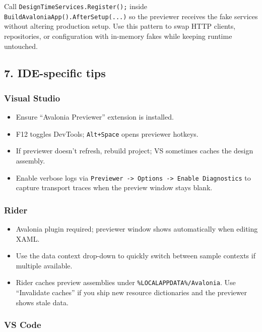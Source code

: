 Call \passthrough{\lstinline!DesignTimeServices.Register();!} inside
\passthrough{\lstinline!BuildAvaloniaApp().AfterSetup(...)!} so the
previewer receives the fake services without altering production setup.
Use this pattern to swap HTTP clients, repositories, or configuration
with in-memory fakes while keeping runtime untouched.

\subsection{7. IDE-specific tips}\label{ide-specific-tips}

\subsubsection{Visual Studio}\label{visual-studio-1}

\begin{itemize}
\tightlist
\item
  Ensure ``Avalonia Previewer'' extension is installed.
\item
  F12 toggles DevTools; \passthrough{\lstinline!Alt+Space!} opens
  previewer hotkeys.
\item
  If previewer doesn't refresh, rebuild project; VS sometimes caches the
  design assembly.
\item
  Enable verbose logs via
  \passthrough{\lstinline!Previewer -> Options -> Enable Diagnostics!}
  to capture transport traces when the preview window stays blank.
\end{itemize}

\subsubsection{Rider}\label{rider-1}

\begin{itemize}
\tightlist
\item
  Avalonia plugin required; previewer window shows automatically when
  editing XAML.
\item
  Use the data context drop-down to quickly switch between sample
  contexts if multiple available.
\item
  Rider caches preview assemblies under
  \passthrough{\lstinline!\%LOCALAPPDATA\%/Avalonia!}. Use ``Invalidate
  caches'' if you ship new resource dictionaries and the previewer shows
  stale data.
\end{itemize}

\subsubsection{VS Code}\label{vs-code-1}

